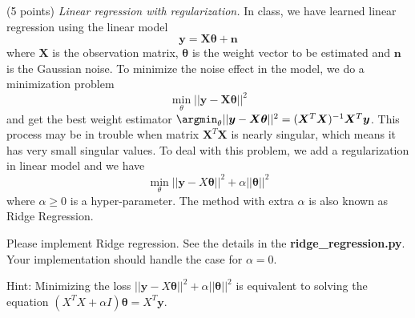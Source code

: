 \documentclass[a4paper, 12pt]{exam}
\begin{document}
	\begin{questions}
		\question (5 points) \emph{Linear regression with regularization.} In class, we have learned linear regression using the linear model
		\begin{equation*}
		\bm{y} = \bm{X}\bm{\theta} + \bm{n}
		\end{equation*}
		where $\bm{X}$ is the observation matrix,
		$\bm{\theta}$ is the weight vector to be estimated and $\bm{n}$ is the Gaussian noise. To minimize the noise effect in the model, we do a minimization problem
		\begin{equation*}
		\min_{\theta}||\bm{y} - \bm{X}\bm{\theta}||^2
		\end{equation*}
		and get the best weight estimator
		$\argmin_{\theta}||\bm{y} - \bm{X}\bm{\theta}||^2 = (\bm{X}^T\bm{X})^{-1}\bm{X}^T\bm{y}$. This process may be in trouble when matrix $\bm{X}^T\bm{X}$ is nearly singular, which means it has very small singular values. %
		To deal with this problem, we add a regularization in linear model and we have
		\begin{equation*}
		\min_{\theta} ||\bm{y} - X\bm{\theta}||^2 + \alpha ||\bm{\theta}||^2
		\end{equation*}
		where $\alpha \geq 0$ is a hyper-parameter. The method with extra $\alpha$ is also known as Ridge Regression.
		
		Please implement Ridge regression. See the details in the \textbf{ridge\_regression.py}.
		Your implementation should handle the case for $\alpha=0$.
		
		Hint: Minimizing the loss $||\bm{y} - X\bm{\theta}||^2 + \alpha ||\bm{\theta}||^2$ is equivalent to solving the equation
		$( X^T X+ \alpha I)\bm{\theta}  = X^T \bm{y}$.
		

\end{questions}
\end{document}
